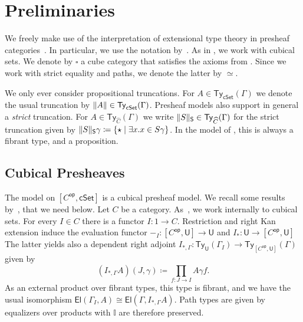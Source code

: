 \documentclass[10pt,a4paper]{article}
\newcommand{\U}{\mathsf{U}}
\newcommand{\cSet}{\mathsf{cSet}}
\DeclareMathOperator\op{\mathsf{op}}
\newcommand\Ty{\mathsf{Ty}}
\newcommand\El{\mathsf{El}}
\DeclarePairedDelimiter\set{\{}{\}}
\newcommand\bbI{\mathbb{I}}
\begin{document}
\section{Preliminaries}\label{sec:preliminaries}

We freely make use of the interpretation of extensional type theory in presheaf categories~\cite{hofmann,huber-phd-thesis}.
In particular, we use the notation by~\cite{huber-phd-thesis}.
As in \cite{draft}, we work with cubical sets.
We denote by \(\square\) a cube category that satisfies the axioms from \cite{survey}.
Since we work with strict equality and paths, we denote the latter by \(\simeq\).


We only ever consider propositional truncations.
For \(A \in \Ty_{\cSet}(\Gamma)\) we denote the usual truncation by \(\trunc{A} \in \Ty_{\cSet}(\Gamma)\).
Presheaf models also support in general a \emph{strict} truncation.
For \(A \in \Ty_{\widehat{C}}(\Gamma)\) we write \(\trunc*{S} \in \Ty_{\widehat{C}}(\Gamma)\) for the strict truncation given by \(\trunc*{S}\gamma \coloneqq \set{ \star \mid \exists x. x \in S\gamma }\).
In the model of \HoTT{}, this is always a fibrant type, and a proposition.


\subsection{Cubical Presheaves}

The model on \([C^{\op}, \cSet]\) is a cubical presheaf model.
We recall some results by~\cite{CRS21}, that we need below.
Let \(C\) be a category.
As~\cite{CRS21}, we work internally to cubical sets.
For every \(I \in C\) there is a functor \(I \colon 1 \to C\).
Restriction and right Kan extension induce the evaluation functor \(-_I \colon [C^{\op}, \U] \to \U\) and \(I_* \colon \U \to [C^{\op}, \U]\)
The latter yields also a dependent right adjoint \(I_{*,\Gamma} \colon \Ty_{\U}(\Gamma_I) \to \Ty_{[C^{\op}, \U]}(\Gamma)\) given by
\[
  (I_{*,\Gamma}A)(J, \gamma) \coloneqq \prod_{f \colon J \to I} A\gamma f.
\]
As an external product over fibrant types, this type is fibrant, and we have the usual isomorphism \(\El(\Gamma_I, A) \cong \El(\Gamma, I_{*,\Gamma}A)\).
Path types are given by equalizers over products with \(\bbI\) are therefore preserved.
\end{document}
